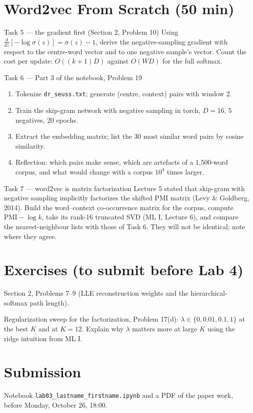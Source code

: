 \documentclass[11pt]{article}
\begin{document}
\section{Word2vec From Scratch (50 min)}
\begin{task}{Task 5 --- the gradient first (Section 2, Problem 10)}
Using $\frac{d}{dz}[-\log\sigma(z)]=\sigma(z)-1$, derive the negative-sampling gradient with respect to the
centre-word vector and to one negative sample's vector. Count the cost per update: $O((k+1)D)$ against
$O(WD)$ for the full softmax.
\end{task}
\begin{task}{Task 6 --- Part 3 of the notebook, Problem 19}
\begin{enumerate}[nosep]
  \item Tokenize \texttt{dr\_seuss.txt}; generate (centre, context) pairs with window 2.
  \item Train the skip-gram network with negative sampling in torch, $D=16$, 5 negatives, 20 epochs.
  \item Extract the embedding matrix; list the 30 most similar word pairs by cosine similarity.
  \item Reflection: which pairs make sense, which are artefacts of a 1{,}500-word corpus, and what would
        change with a corpus $10^4$ times larger.
\end{enumerate}
\end{task}
\begin{task}{Task 7 --- word2vec is matrix factorization}
Lecture 5 stated that skip-gram with negative sampling implicitly factorizes the shifted PMI matrix
(Levy \& Goldberg, 2014). Build the word--context co-occurrence matrix for the corpus, compute
$\text{PMI}-\log k$, take its rank-16 truncated SVD (ML I, Lecture 6), and compare the nearest-neighbour
lists with those of Task 6. They will not be identical; note where they agree.
\end{task}

\section{Exercises (to submit before Lab 4)}
\begin{exercise}
Section 2, Problems 7--9 (LLE reconstruction weights and the hierarchical-softmax path length).
\end{exercise}
\begin{exercise}
Regularization sweep for the factorization, Problem 17(d): $\lambda\in\{0,0.01,0.1,1\}$ at the best $K$ and
at $K=12$. Explain why $\lambda$ matters more at large $K$ using the ridge intuition from ML I.
\end{exercise}

\section*{Submission}
Notebook \texttt{lab03\_lastname\_firstname.ipynb} and a PDF of the paper work, before Monday, October 26, 18:00.
\end{document}
